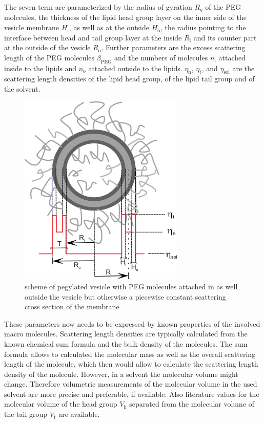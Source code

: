 The seven term are parameterized by the radius of gyration $R_g$ of the PEG molecules, the thickness of the lipid head group layer on the inner side of the vesicle membrane $H_\mathrm{i}$, as well as at the outside $H_\mathrm{o}$, the radius pointing to the interface between head and tail group layer at the inside $R_\mathrm{i}$ and its counter part at the outside of the vesicle $R_\mathrm{o}$. Further parameters are the excess scattering length of the PEG molecules $\beta_\mathrm{PEG}$ and the numbers of molecules $n_\mathrm{i}$ attached inside to the lipids and $n_\mathrm{o}$ attached outside to the lipids. $\eta_\mathrm{h}$, $\eta_\mathrm{t}$, and $\eta_\mathrm{sol}$ are the scattering length densities of the lipid head group, of the lipid tail group and of the solvent.

\begin{figure}[htb]
\begin{center}
\includegraphics[width=0.7\textwidth]{../images/form_factor/vesicles/vesiclePEGpiecewconst.png}
\end{center}
\caption{scheme of pegylated vesicle with PEG molecules attached in as well outside the vesicle but otherwise a piecewise constant scattering cross section of the membrane}
\label{fig:vesiclePEGpiecewconst}
\end{figure}

These parameters now needs to be expressed by known properties of the involved macro molecules. Scattering length densities are typically calculated from the known chemical sum formula and the bulk density of the molecules. The sum formula allows to calculated the molecular mass as well as the overall scattering length of the molecule, which then would allow to calculate the scattering length density of the molecule. However, in a solvent the molecular volume might change. Therefore volumetric measurements of the molecular volume in the used solvent are more precise and preferable, if available. Also literature values for the molecular volume of the head group $V_\mathrm{h}$ separated from the molecular volume of the tail group $V_\mathrm{t}$ are available.

